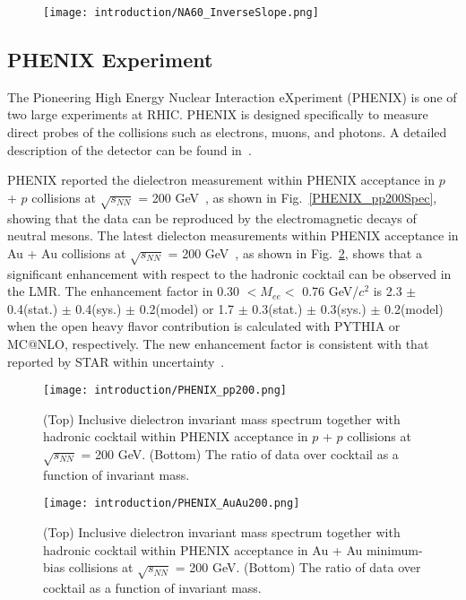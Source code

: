 \begin{figure}[htbp]
\centering
\texttt{[image: introduction/NA60\_InverseSlope.png]}
 \label{NA60_Teff}
\end{figure}

\subsection{PHENIX Experiment}
The Pioneering High Energy Nuclear Interaction eXperiment (PHENIX) is one of two large experiments at RHIC. PHENIX is designed specifically to measure direct probes of the collisions such as electrons, muons, and photons.  A detailed description of the detector can be found in~\cite{PHENIX:overview, PHENIX:HBD}.

PHENIX reported the dielectron measurement within PHENIX acceptance in $p$ + $p$ collisions at $\sqrt{s_{NN}}$ = 200 GeV~\cite{PHENIX:dielectron0}, as shown in Fig.~\ref{PHENIX_pp200Spec}, showing that the data can be reproduced by the electromagnetic decays of neutral mesons. The latest dielecton measurements within PHENIX acceptance in Au + Au collisions at $\sqrt{s_{NN}}$ = 200 GeV~\cite{PHENIX:dielectron0}, as shown in Fig.~\ref{PHENIX_AuAu200Spec}, shows that a significant enhancement with respect to the hadronic cocktail can be observed in the LMR. The enhancement factor in 0.30 $<M_{ee}<$ 0.76 GeV/$c^{2}$ is 2.3 $\pm$ 0.4(stat.) $\pm$ 0.4(sys.) $\pm$ 0.2(model) or 1.7 $\pm$ 0.3(stat.) $\pm$ 0.3(sys.) $\pm$ 0.2(model) when the open heavy flavor contribution is  calculated with PYTHIA or MC@NLO, respectively. The new enhancement factor is consistent with that reported by STAR within uncertainty~\cite{STAR:dielectron1}.

\begin{figure}[htbp]
\begin{minipage}[htbp]{0.49\linewidth}
\centering
\texttt{[image: introduction/PHENIX\_pp200.png]}
\caption{(Top) Inclusive dielectron invariant mass spectrum together with hadronic cocktail within PHENIX acceptance in $p$ + $p$ collisions at $\sqrt{s_{NN}}$ = 200 GeV. (Bottom) The ratio of data over cocktail as a function of invariant mass. \label{PHENIX_pp200Spec}}
\end{minipage}
\hfill
\begin{minipage}[htbp]{0.49\linewidth}
\centering
\texttt{[image: introduction/PHENIX\_AuAu200.png]} 
\caption{(Top) Inclusive dielectron invariant mass spectrum together with hadronic cocktail within PHENIX acceptance in Au + Au minimum-bias collisions at $\sqrt{s_{NN}}$ = 200 GeV. (Bottom) The ratio of data over cocktail as a function of invariant mass.\label{PHENIX_AuAu200Spec}}
\end{minipage}
\end{figure}

